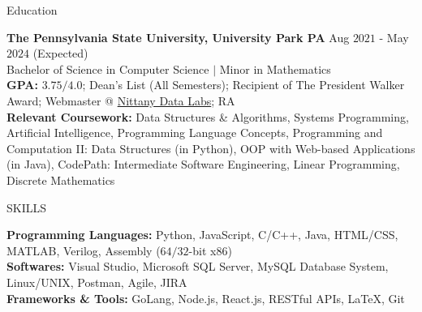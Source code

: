 \documentclass{resume} %
\begin{document}

\begin{rSection}{Education}

{\bf The Pennsylvania State University, University Park PA} \hfill {Aug $2021$ - May $2024$ (Expected)}\\
{Bachelor of Science in Computer Science $\vert$ Minor in Mathematics}\\
{\bf GPA:} $3.75/4.0$; Dean's List (All Semesters); Recipient of The President Walker Award; Webmaster @ \href{https://ndl.psu.edu/}{Nittany Data Labs}; RA\\
{\bf Relevant Coursework:} Data Structures \& Algorithms, Systems Programming, Artificial Intelligence, Programming Language Concepts, Programming and Computation II: Data Structures (in Python), OOP with Web-based Applications (in Java), CodePath: Intermediate Software Engineering, Linear Programming, Discrete Mathematics
\end{rSection}


\begin{rSection}{SKILLS}

{\bf Programming Languages:} Python, JavaScript, C/C++, Java, HTML/CSS, MATLAB, Verilog, Assembly ($64/32$-bit x$86$)\\
{\bf Softwares:} Visual Studio, Microsoft SQL Server, MySQL Database System, Linux/UNIX, Postman, Agile, JIRA\\
{\bf Frameworks \& Tools:} GoLang, Node.js, React.js, RESTful APIs, \LaTeX, Git

\end{rSection}
\end{document}
